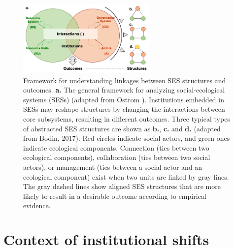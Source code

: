 \documentclass{nsr}
\begin{document}
\begin{figure}
	\centering
	\includegraphics[width=16pc]{../../../figs/diagrams/framework.jpg}
	\caption{
		Framework for understanding linkages between SES structures and outcomes.
		\textbf{a.} The general framework for analyzing social-ecological systems (SESs) (adapted from Ostrom \cite{ostromGeneralFrameworkAnalyzing2009}). Institutions embedded in SESs may reshape structures by changing the interactions between core subsystems, resulting in different outcomes.
        Three typical types of abstracted SES structures are shown as \textbf{b.}, \textbf{c.} and \textbf{d.} (adapted from Bodin, 2017)\cite{bodinCollaborativeenvironmentalgovernance2017}. Red circles indicate social actors, and green ones indicate ecological components. Connection (ties between two ecological components), collaboration (ties between two social actors), or management (ties between a social actor and an ecological component) exist when two units are linked by gray lines. The gray dashed lines show aligned SES structures that are more likely to result in a desirable outcome according to empirical evidence.
	}
    \label{fig:framework}
\end{figure}

\section{Context of institutional shifts}\label{institution}

\end{document}
